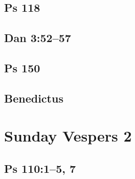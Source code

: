 \subsection{Ps 118}

{%
\parindent 0pt
\noindent
\ifx\preLilyPondExample \undefined
\else
  \expandafter\preLilyPondExample
\fi
\def\lilypondbook{}%

\ifx\postLilyPondExample \undefined
\else
  \expandafter\postLilyPondExample
\fi
}

\subsection{Dan 3:52--57}

{%
\parindent 0pt
\noindent
\ifx\preLilyPondExample \undefined
\else
  \expandafter\preLilyPondExample
\fi
\def\lilypondbook{}%

\ifx\postLilyPondExample \undefined
\else
  \expandafter\postLilyPondExample
\fi
}

\subsection{Ps 150}

{%
\parindent 0pt
\noindent
\ifx\preLilyPondExample \undefined
\else
  \expandafter\preLilyPondExample
\fi
\def\lilypondbook{}%

\ifx\postLilyPondExample \undefined
\else
  \expandafter\postLilyPondExample
\fi
}

\subsection{Benedictus}

{%
\parindent 0pt
\noindent
\ifx\preLilyPondExample \undefined
\else
  \expandafter\preLilyPondExample
\fi
\def\lilypondbook{}%

\ifx\postLilyPondExample \undefined
\else
  \expandafter\postLilyPondExample
\fi
}


\section{Sunday Vespers 2}

\subsection{Ps 110:1--5, 7}

{%
\parindent 0pt
\noindent
\ifx\preLilyPondExample \undefined
\else
  \expandafter\preLilyPondExample
\fi
\def\lilypondbook{}%

\ifx\postLilyPondExample \undefined
\else
  \expandafter\postLilyPondExample
\fi
}

